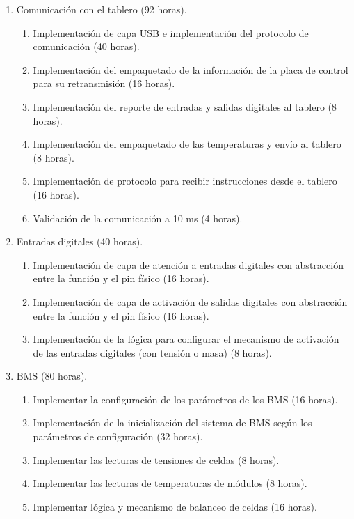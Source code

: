 \documentclass[
11pt, %
codirector, %
]{charter}
\begin{document}
\begin{enumerate}
	\item Comunicación con el tablero (92 horas).
	      \begin{enumerate}
		      \item Implementación de capa USB e implementación del protocolo de comunicación (40 horas).
		      \item Implementación del empaquetado de la información de la placa de control para su retransmisión (16 horas).
		      \item Implementación del reporte de entradas y salidas digitales al tablero (8 horas).
		      \item Implementación del empaquetado de las temperaturas y envío al tablero (8 horas).
		      \item Implementación de protocolo para recibir instrucciones desde el tablero (16 horas).
		      \item Validación de la comunicación a 10 ms (4 horas).
	      \end{enumerate}
	\item Entradas digitales (40 horas).
	      \begin{enumerate}
		      \item Implementación de capa de atención a entradas digitales con abstracción entre la función y el pin físico (16 horas).
		      \item Implementación de capa de activación de salidas digitales con abstracción entre la función y el pin físico (16 horas).
		      \item Implementación de la lógica para configurar el mecanismo de activación de las entradas digitales (con tensión o masa) (8 horas).
	      \end{enumerate}
	\item BMS (80 horas).
	      \begin{enumerate}
		      \item Implementar la configuración de los parámetros de los BMS (16 horas).
		      \item Implementación de la inicialización del sistema de BMS según los parámetros de configuración (32 horas).
		      \item Implementar las lecturas de tensiones de celdas (8 horas).
		      \item Implementar las lecturas de temperaturas de módulos (8 horas).
		      \item Implementar lógica y mecanismo de balanceo de celdas (16 horas).
	      \end{enumerate}

\end{enumerate}
\end{document}
